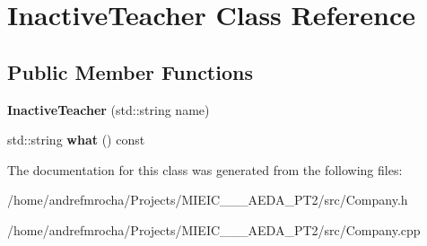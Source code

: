 \hypertarget{class_inactive_teacher}{}\section{Inactive\+Teacher Class Reference}
\label{class_inactive_teacher}
\subsection*{Public Member Functions}
\begin{DoxyCompactItemize}
\item 
\mbox{\label{class_inactive_teacher_af3b09b6cd0eb7865e5258ce5b436bccc}} 
{\bfseries Inactive\+Teacher} (std\+::string name)
\item 
\mbox{\label{class_inactive_teacher_a86daeb5ff2ac47d16ad5460ac17ef001}} 
std\+::string {\bfseries what} () const
\end{DoxyCompactItemize}


The documentation for this class was generated from the following files\+:\begin{DoxyCompactItemize}
\item 
/home/andrefmrocha/\+Projects/\+M\+I\+E\+I\+C\+\_\+\_\+\_\+\+A\+E\+D\+A\+\_\+\+P\+T2/src/Company.\+h\item 
/home/andrefmrocha/\+Projects/\+M\+I\+E\+I\+C\+\_\+\_\+\_\+\+A\+E\+D\+A\+\_\+\+P\+T2/src/Company.\+cpp\end{DoxyCompactItemize}
